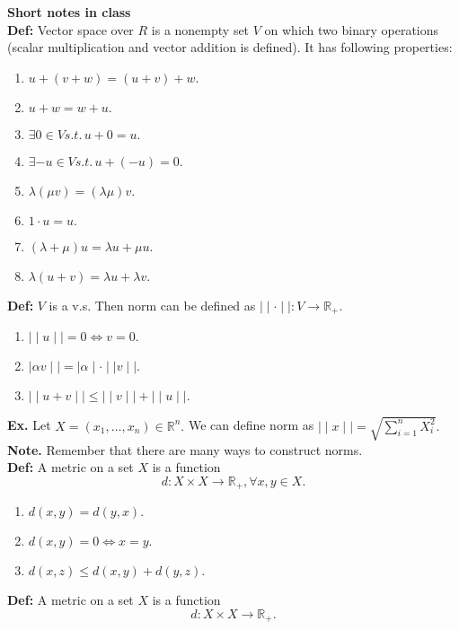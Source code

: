 \documentclass[a4paper]{article}
\newcommand{\R}{\mathbb{R}}
\begin{document}
\textbf{Short notes in class}\\

\textbf{Def:} Vector space over $R$ is a nonempty set $V$ on which two binary operations (scalar multiplication and vector addition is defined). It has following properties:
\begin{enumerate}
	\item $u + (v+w)=(u+v)+w.$
	\item $u+w=w+u.$
	\item $\exists 0 \in V s.t.\, u+0=u.$ 
	\item $\exists -u \in V s.t. \, u+(-u)=0.$
	\item $\lambda (\mu v) = (\lambda \mu) v.$
	\item  $1 \cdot u = u.$
	\item $\left( \lambda + \mu \right) u = \lambda u + \mu u.$
	\item $\lambda (u+v) = \lambda u + \lambda v.$
\end{enumerate}

\textbf{Def:} $V$ is a v.s. Then norm can be defined as $ \mid  \mid  \cdot  \mid  \mid : V \to \R_+$.
\begin{enumerate}
	\item $ \mid  \mid u  \mid  \mid = 0 \iff v=0.$
	\item  $\mid \alpha v  \mid  \mid =  \mid \alpha  \mid  \cdot \mid  \mid v  \mid  \mid .$ 
	\item $ \mid  \mid u+v  \mid  \mid  \le   \mid  \mid  v \mid  \mid +  \mid  \mid u  \mid  \mid .$ 
\end{enumerate}

\textbf{Ex.} Let $X = \left( x_1, \ldots , x_{n} \right) \in \R^{n}.$ We can define norm as $ \mid  \mid x \mid  \mid = \sqrt{\sum_{i=1}^{n} X_{i}^{2}}.$\\

\textbf{Note.} Remember that there are many ways to construct norms.\\

\textbf{Def:} A metric on a set $X$ is a function 
\[
d: X \times X \to \R_+, \forall x,y \in X
.\] 
\begin{enumerate}
	\item $d(x,y)=d(y,x).$
	\item $d(x,y)=0 \iff x=y.$
	\item $d(x,z) \le  d(x,y) + d(y,z).$
\end{enumerate}


\textbf{Def:} A metric on a set $X$ is a function
\[
d: X \times X \to \R_+
.\] 
\end{document}
